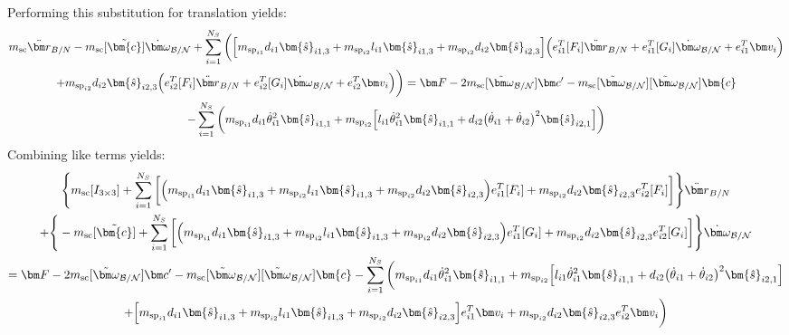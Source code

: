 \documentclass[paper]{aiaaNew}
\begin{document}
Performing this substitution for translation yields:
\begin{multline}
m_\text{sc} \ddot{\bm r}_{B/N} -m_\text{sc} [\tilde{\bm{c}}] \dot{\bm\omega}_{\cal B/N} +  \sum_{i=1}^{N_{S}}\bigg(\Big[m_{\text{sp}_{i1}}d_{i1} \bm{\hat{s}}_{i1,3} +m_{\text{sp}_{i2}}l_{i1} \bm{\hat{s}}_{i1,3}+m_{\text{sp}_{i2}} d_{i2}\bm{\hat{s}}_{i2,3}\Big]\Big(e_{i1}^T[F_i] \ddot{\bm r}_{B/N} + e_{i1}^T[G_i]\dot{\bm\omega}_{\cal B/N} + e_{i1}^T\bm v_i\Big) \\+m_{\text{sp}_{i2}} d_{i2} \bm{\hat{s}}_{i2,3}\Big(e_{i2}^T[F_i] \ddot{\bm r}_{B/N} + e_{i2}^T[G_i]\dot{\bm\omega}_{\cal B/N} + e_{i2}^T\bm v_i\Big)\bigg) 
= \bm F - 2m_\text{sc} [\tilde{\bm\omega}_{\cal B/N}] \bm c'- m_\text{sc} [\tilde{\bm\omega}_{\cal B/N}][\tilde{\bm\omega}_{\cal B/N}]\bm{c}\\
-\sum_{i=1}^{N_{S}}\bigg(m_{\text{sp}_{i1}}d_{i1} \dot{\theta}_{i1}^2 \bm{\hat{s}}_{i1,1} +m_{\text{sp}_{i2}}\Big[l_{i1} \dot{\theta}_{i1}^2 \bm{\hat{s}}_{i1,1} + d_{i2}\big(\dot{\theta}_{i1} + \dot{\theta}_{i2}\big)^2\bm{\hat{s}}_{i2,1}\Big]\bigg) 
\label{eq:Rbddot5}
\end{multline}
Combining like terms yields:
\begin{multline}
\Bigg \lbrace m_\text{sc} [I_{3\times 3}] +  \sum_{i=1}^{N_{S}}\bigg[\Big(m_{\text{sp}_{i1}}d_{i1} \bm{\hat{s}}_{i1,3} +m_{\text{sp}_{i2}}l_{i1} \bm{\hat{s}}_{i1,3}+m_{\text{sp}_{i2}} d_{i2}\bm{\hat{s}}_{i2,3}\Big)e_{i1}^T[F_i] +m_{\text{sp}_{i2}} d_{i2} \bm{\hat{s}}_{i2,3}e_{i2}^T[F_i] \bigg] \Bigg \rbrace \ddot{\bm r}_{B/N} \\
+\Bigg \lbrace-m_\text{sc} [\tilde{\bm{c}}] +  \sum_{i=1}^{N_{S}}\bigg[\Big(m_{\text{sp}_{i1}}d_{i1} \bm{\hat{s}}_{i1,3} +m_{\text{sp}_{i2}}l_{i1} \bm{\hat{s}}_{i1,3}+m_{\text{sp}_{i2}} d_{i2}\bm{\hat{s}}_{i2,3}\Big) e_{i1}^T[G_i] +m_{\text{sp}_{i2}} d_{i2} \bm{\hat{s}}_{i2,3} e_{i2}^T[G_i]\bigg] \Bigg \rbrace \dot{\bm\omega}_{\cal B/N} \\
= \bm F - 2m_\text{sc} [\tilde{\bm\omega}_{\cal B/N}] \bm c'- m_\text{sc} [\tilde{\bm\omega}_{\cal B/N}][\tilde{\bm\omega}_{\cal B/N}]\bm{c}
-\sum_{i=1}^{N_{S}}\bigg(m_{\text{sp}_{i1}}d_{i1} \dot{\theta}_{i1}^2 \bm{\hat{s}}_{i1,1} +m_{\text{sp}_{i2}}\Big[l_{i1} \dot{\theta}_{i1}^2 \bm{\hat{s}}_{i1,1} + d_{i2}\big(\dot{\theta}_{i1} + \dot{\theta}_{i2}\big)^2\bm{\hat{s}}_{i2,1}\Big]\\
 +\Big[m_{\text{sp}_{i1}}d_{i1} \bm{\hat{s}}_{i1,3} +m_{\text{sp}_{i2}}l_{i1} \bm{\hat{s}}_{i1,3}+m_{\text{sp}_{i2}} d_{i2}\bm{\hat{s}}_{i2,3}\Big]e_{i1}^T\bm v_i 
+m_{\text{sp}_{i2}} d_{i2} \bm{\hat{s}}_{i2,3}e_{i2}^T\bm v_i \bigg) 
\label{eq:Rbddot6}
\end{multline}
\end{document}

